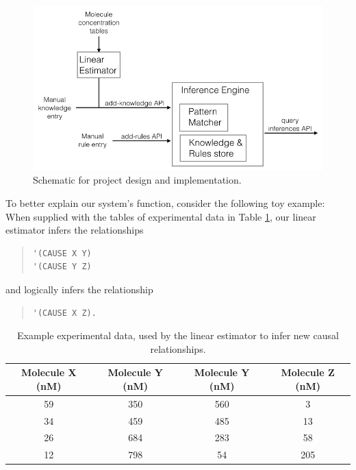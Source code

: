 \documentclass[11pt]{article}
\begin{document}
\begin{figure}[htb]
\centering
\includegraphics[width=.9\linewidth]{../docs/systemdiagram.png}
\caption{\label{fig:system-diagram}Schematic for project design and implementation.}
\end{figure}

To better explain our system's function, consider the following toy example: When supplied with the tables of experimental data in Table \ref{tab:toy-data}, our linear estimator infers the relationships

\begin{quote}
\begin{verbatim}
'(CAUSE X Y)
'(CAUSE Y Z)
\end{verbatim}
\end{quote}

and logically infers the relationship

\begin{quote}
\begin{verbatim}
'(CAUSE X Z).
\end{verbatim}
\end{quote}

\begin{table}[htb]
\caption{\label{tab:toy-data}Example experimental data, used by the linear estimator to infer new causal relationships.}
\centering
\begin{tabular}{cc|cc}
Molecule X (nM) & Molecule Y (nM) & Molecule Y (nM) & Molecule Z (nM)\\
\hline
59 & 350 & 560 & 3\\
34 & 459 & 485 & 13\\
26 & 684 & 283 & 58\\
12 & 798 & 54 & 205\\
\end{tabular}
\end{table}
\end{document}
